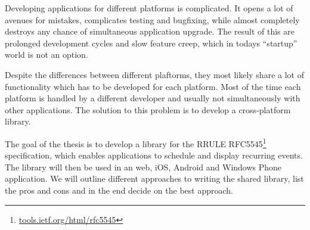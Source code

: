 \begin{Abstract}

Developing applications for different platforms is complicated. It opens a lot of avenues for mistakes, complicates testing and bugfixing, while almost completely destroys any chance of simultaneous application upgrade. The result of this are prolonged development cycles and slow feature creep, which in todays ``startup'' world is not an option.

Despite the differences between different plaftorms, they most likely share a lot of functionality which has to be developed for each platform. Most of the time each platform is handled by a different developer and usually not simultaneously with other applications. The solution to this problem is to develop a cross-platform library.

The goal of the thesis is to develop a library for the RRULE RFC5545\footnote{\href{http://tools.ietf.org/html/rfc5545\#section-3.3.10}{tools.ietf.org/html/rfc5545}} specification, which enables applications to schedule and display recurring events. The library will then be used in an web, iOS, Android and Windows Phone application. We will outline different approaches to writing the shared library, list the pros and cons and in the end decide on the best approach.
\end{Abstract}
